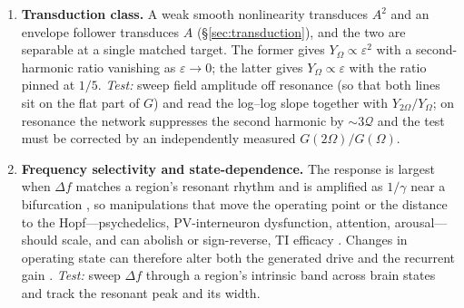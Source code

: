 \documentclass[11pt,a4paper]{article}
\newcommand{\Sig}{\sigma}
\providecommand{\DIFaddtex}[1]{{\protect\color{blue} \sf #1}} %
\providecommand{\DIFdeltex}[1]{{\protect\color{red} \scriptsize #1}} %
\providecommand{\DIFaddbegin}{} %
\providecommand{\DIFaddend}{} %
\providecommand{\DIFdelbegin}{} %
\providecommand{\DIFdelend}{} %
\providecommand{\DIFadd}[1]{\texorpdfstring{\DIFaddtex{#1}}{#1}} %
\providecommand{\DIFdel}[1]{\texorpdfstring{\DIFdeltex{#1}}{}} %
\begin{document}
\begin{enumerate}[leftmargin=*]
the operating point through the detector coefficient, and the two modeled detectors
disagree on how: the memoryless sigmoid follows $\Sig''(v^*)$ and reverses sign across the
inflection, where PEIX (Eq.~\eqref{eq:peix}) peaks; the dynamic mean field at a fast
carrier follows $F'$ and the network susceptibility, without a sign rule
(\S\ref{sec:dynamic}). \emph{Test:} \DIFdelbegin \DIFdel{shift $v^*$ with tonic drive , neuromodulation, or task
state at a fixed beat, and sweep the carrier at a fixed beat }\DIFdelend \DIFaddbegin \DIFadd{vary tonic drive and carrier frequency while
measuring both amplitude and phase of the beat response. Compare these with the
predicted mixing coefficient after accounting for changes in network susceptibility;
a response-amplitude change alone does not isolate the detector}\DIFaddend .
\DIFdelbegin \DIFdel{A sign reversal across the
operating point would select the memoryless description, a monotonic change the dynamic
one.
}\DIFdelend \item \textbf{Transduction class.} A weak smooth nonlinearity transduces $A^2$ and an
envelope follower transduces $A$ (\S\ref{sec:transduction}), and the two are separable at a
single matched target. The former gives $Y_\Omega\propto\varepsilon^2$ with a second-harmonic
ratio vanishing as $\varepsilon\!\to\!0$; the latter gives $Y_\Omega\propto\varepsilon$ with
the ratio pinned at $1/5$. \emph{Test:} sweep field amplitude off resonance (so that both
lines sit on the flat part of $G$) and read the log--log slope together with
$Y_{2\Omega}/Y_\Omega$; on resonance the network suppresses the second harmonic by
$\sim 3\mathcal{Q}$ and the test must be corrected by an independently measured
$G(2\Omega)/G(\Omega)$.

\item \textbf{Frequency selectivity and state-dependence.} The response is largest
when $\Delta f$ matches a region's resonant rhythm and is amplified as $1/\gamma$ near
a bifurcation\DIFdelbegin \DIFdel{, so manipulations that move the operating point or the distance to the
Hopf---psychedelics, PV-interneuron dysfunction, attention, arousal---should scale,
and can abolish or sign-reverse, TI efficacy }\DIFdelend \DIFaddbegin \DIFadd{. Changes in operating state can therefore alter both the generated
drive and the recurrent gain }\DIFaddend \cite{ruffini2025cfc}. \emph{Test:}
sweep $\Delta f$ through a region's intrinsic band across brain states and track the
resonant peak and its width.
\end{enumerate}
\end{document}
